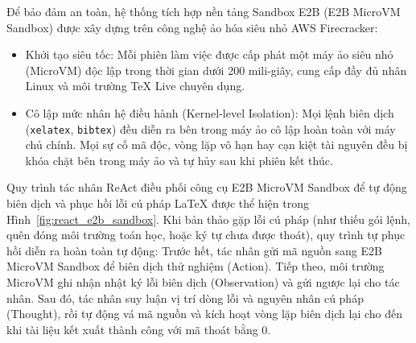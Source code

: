 Để bảo đảm an toàn, hệ thống tích hợp nền tảng Sandbox E2B (E2B MicroVM Sandbox) được xây dựng trên công nghệ ảo hóa siêu nhỏ AWS Firecracker:
\begin{itemize}
    \item Khởi tạo siêu tốc: Mỗi phiên làm việc được cấp phát một máy ảo siêu nhỏ (MicroVM) độc lập trong thời gian dưới 200 mili-giây, cung cấp đầy đủ nhân Linux và môi trường TeX Live chuyên dụng.
    \item Cô lập mức nhân hệ điều hành (Kernel-level Isolation): Mọi lệnh biên dịch (\texttt{xelatex}, \texttt{bibtex}) đều diễn ra bên trong máy ảo cô lập hoàn toàn với máy chủ chính. Mọi sự cố mã độc, vòng lặp vô hạn hay cạn kiệt tài nguyên đều bị khóa chặt bên trong máy ảo và tự hủy sau khi phiên kết thúc.
\end{itemize}

Quy trình tác nhân ReAct điều phối công cụ E2B MicroVM Sandbox để tự động biên dịch và phục hồi lỗi cú pháp LaTeX được thể hiện trong Hình~\ref{fig:react_e2b_sandbox}. Khi bản thảo gặp lỗi cú pháp (như thiếu gói lệnh, quên đóng môi trường toán học, hoặc ký tự chưa được thoát), quy trình tự phục hồi diễn ra hoàn toàn tự động: Trước hết, tác nhân gửi mã nguồn sang E2B MicroVM Sandbox để biên dịch thử nghiệm (Action). Tiếp theo, môi trường MicroVM ghi nhận nhật ký lỗi biên dịch (Observation) và gửi ngược lại cho tác nhân. Sau đó, tác nhân suy luận vị trí dòng lỗi và nguyên nhân cú pháp (Thought), rồi tự động vá mã nguồn và kích hoạt vòng lặp biên dịch lại cho đến khi tài liệu kết xuất thành công với mã thoát bằng 0.

